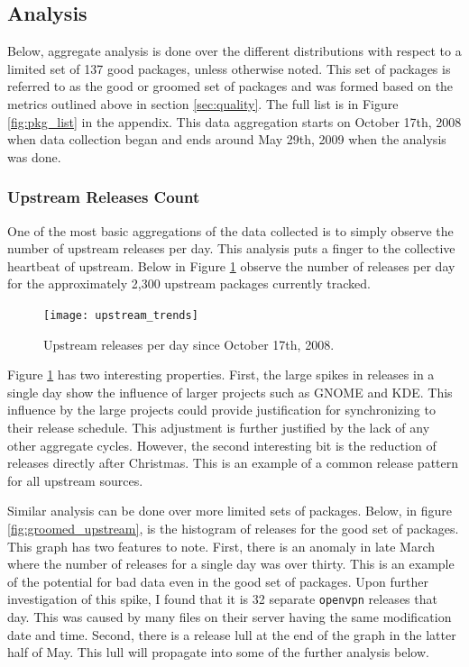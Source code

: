 \documentclass[letterpaper,10pt]{article}
\begin{document}
\subsection{Analysis}
Below, aggregate analysis is done over the different distributions with respect to a limited set of 137 good packages, unless otherwise noted.  This set of packages is referred to as the good or groomed set of packages and was formed based on the metrics outlined above in section \ref{sec:quality}.  The full list is in Figure \ref{fig:pkg_list} in the appendix.  This data aggregation starts on October 17th, 2008 when data collection began and ends around May 29th, 2009 when the analysis was done.
\subsubsection{Upstream Releases Count}
\label{sec:upstream_hist}
One of the most basic aggregations of the data collected is to simply observe the number of upstream releases per day.  This analysis puts a finger to the collective heartbeat of upstream.  Below in Figure \ref{fig:upstream} observe the number of releases per day for the approximately 2,300 upstream packages currently tracked.

\begin{figure}[htbp]
\texttt{[image: upstream\_trends]}
\caption{Upstream releases per day since October 17th, 2008.}
\label{fig:upstream}
\end{figure}

Figure \ref{fig:upstream} has two interesting properties.  First, the large spikes in releases in a single day show the influence of larger projects such as GNOME and KDE.  This influence by the large projects could provide justification for synchronizing to their release schedule.  This adjustment is further justified by the lack of any other aggregate cycles.  However, the second interesting bit is the reduction of releases directly after Christmas.  This is an example of a common release pattern for all upstream sources.

Similar analysis can be done over more limited sets of packages.  Below, in figure \ref{fig:groomed_upstream}, is the histogram of releases for the good set of packages.  This graph has two features to note.  First, there is an anomaly in late March where the number of releases for a single day was over thirty.  This is an example of the potential for bad data even in the good set of packages.  Upon further investigation of this spike, I found that it is 32 separate \texttt{openvpn} releases that day.  This was caused by many files on their server having the same modification date and time.  Second, there is a release lull at the end of the graph in the latter half of May.  This lull will propagate into some of the further analysis below.
\end{document}
